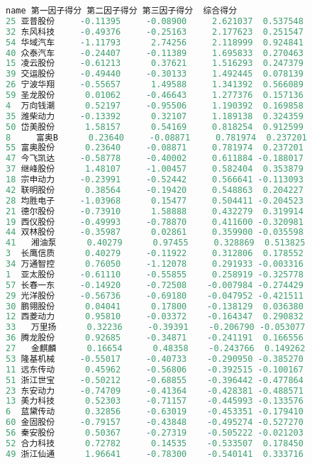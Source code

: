 \documentclass[11pt,a4paper,oneside]{book}
\begin{document}
\begin{lstlisting}[language=r]
      name 第一因子得分 第二因子得分 第三因子得分  综合得分
25 亚普股份     -0.11395     -0.08900     2.621037  0.537548
32 东风科技     -0.49376     -0.25163     2.177623  0.251547
54 华域汽车     -1.11793      2.74256     2.118999  0.924841
40 众泰汽车     -0.24407     -0.11389     1.695833  0.270463
15 凌云股份     -0.61213      0.37621     1.516293  0.247379
39 交运股份     -0.49440     -0.30133     1.492445  0.078139
26 宁波华翔     -0.55657      1.49588     1.341392  0.566089
59 圣龙股份      0.01062     -0.46643     1.277376  0.157136
4  万向钱潮      0.52197     -0.95506     1.190392  0.169858
35 潍柴动力     -0.13392      0.32107     1.189138  0.324359
50 岱美股份      1.58157      0.54169     0.818254  0.912599
8     富奥B      0.23640     -0.08871     0.781974  0.237201
55 富奥股份      0.23640     -0.08871     0.781974  0.237201
47 今飞凯达     -0.58778     -0.40002     0.611884 -0.188017
37 继峰股份      1.48107     -1.00457     0.582404  0.353879
18 宗申动力     -0.23991     -0.52442     0.566641 -0.113093
42 联明股份      0.38564     -0.19420     0.548863  0.204227
28 均胜电子     -1.03968      0.15477     0.504411 -0.204523
21 德尔股份     -0.73910      1.58888     0.432279  0.319914
19 西仪股份     -0.49993     -0.78870     0.411600 -0.320981
44 双林股份     -0.35987      0.02861     0.359900 -0.035598
41   湘油泵      0.40279      0.97455     0.328869  0.513825
3  长鹰信质      0.40279     -0.11922     0.312806  0.178552
34 万通智控      0.76050     -1.12078     0.291933 -0.003316
1  亚太股份     -0.61110     -0.55855     0.258919 -0.325778
57 长春一东     -0.14920     -0.72508    -0.007984 -0.274429
29 光洋股份     -0.56736     -0.69180    -0.047952 -0.421511
30 鹏翎股份      0.04041      0.17800    -0.138129  0.036380
12 西菱动力      0.95810     -0.03372    -0.164347  0.290832
33   万里扬      0.32236     -0.39391    -0.206790 -0.053077
36 腾龙股份      0.92685     -0.34871    -0.241191  0.166556
27   金麒麟      0.16654      0.48358    -0.243766  0.149262
53 隆基机械     -0.55017     -0.40733    -0.290950 -0.385270
11 远东传动      0.45962     -0.56806    -0.392515 -0.100167
51 浙江世宝     -0.50212     -0.68855    -0.396442 -0.477864
23 东安动力     -0.74709     -0.41364    -0.428381 -0.488571
13 美力科技      0.52303     -0.71157    -0.445993 -0.133576
6  蓝黛传动      0.32856     -0.63019    -0.453351 -0.179410
60 金固股份     -0.79157     -0.43848    -0.495274 -0.527270
56 秦安股份      0.50367     -0.27319    -0.505222 -0.021203
52 合力科技      0.72782      0.14535    -0.533507  0.178450
49 浙江仙通      1.96641     -0.78300    -0.540141  0.333716

\end{lstlisting}
\end{document}
